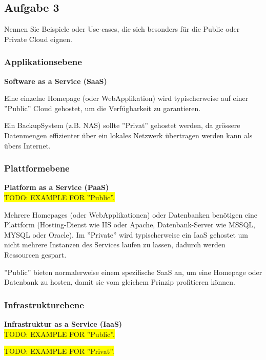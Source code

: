 \documentclass[11pt,titlepage]{article}
\newenvironment{shadedquotation}
 {\begin{shaded*}
  \quoting[leftmargin=0pt, vskip=0pt]
 }
 {\endquoting
 \end{shaded*}
}
\begin{document}
  \par\medskip

\subsection{Aufgabe 3}
\label{sec:Aufgabe-3}

\begin{shadedquotation}
  Nennen Sie Beispiele oder Use-cases, die sich besonders für die Public oder Private Cloud eignen.
\end{shadedquotation}

\subsubsection{Applikationsebene}
\label{subsec:Aufgabe-3_Applikationsebene}
{\large\bf Software as a Service (SaaS)} \\\medskip

Eine einzelne Homepage (oder WebApplikation) wird typischerweise auf einer ''Public'' Cloud gehostet, um die Verfügbarkeit zu garantieren.
\medskip

Ein BackupSystem (z.B. NAS) sollte ''Privat'' gehostet werden, da grössere Datenmengen effizienter über ein lokales Netzwerk übertragen werden kann als übers Internet.

\subsubsection{Plattformebene}
\label{subsec:Aufgabe-3_Plattformebene}
{\large\bf Platform as a Service (PaaS)} \\\medskip
\colorbox{yellow}{TODO: EXAMPLE FOR ''Public''.}
\par\medskip

Mehrere Homepages (oder WebApplikationen) oder Datenbanken benötigen eine Plattform (Hosting-Dienst wie IIS oder Apache, Datenbank-Server wie MSSQL, MYSQL oder Oracle). 
Im ''Private'' wird typischerweise ein IaaS gehostet um nicht mehrere Instanzen des Services laufen zu lassen, dadurch werden Ressourcen gespart.

''Public'' bieten normalerweise einem spezifische SaaS an, um eine Homepage oder Datenbank zu hosten, damit sie vom gleichem Prinzip profitieren können.

\subsubsection{Infrastrukturebene}
\label{subsec:Aufgabe-3_Infrastrukturebene}
{\large\bf Infrastruktur as a Service (IaaS)} \\\medskip
\colorbox{yellow}{TODO: EXAMPLE FOR ''Public''.}
\par\medskip
\colorbox{yellow}{TODO: EXAMPLE FOR ''Privat''.}
\end{document}
